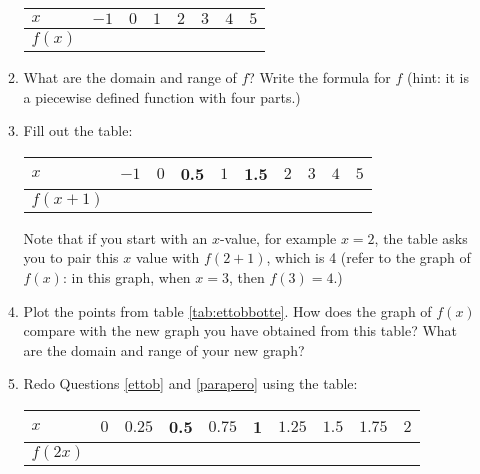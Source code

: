 \documentclass[11pt,dvipsnames]{article}
\begin{document}
\begin{enumerate}[label=$\blacktriangleright$ {\bf  \arabic*:}]
\begin{enumerate}[label=\textcolor{blue}{\bf (\alph*)}]
\begin{minipage}{\linewidth}
\centering
{} \label{tab:title} 
\begin{tabular}{|l|l|l|l|l|l|l|l|}
\hline
$x$    & $-1$ & $0$ & $1$ & $2$ & $3$ & $4$ & $5$ \\ \hline
$f(x)$ &      &     &     &     &     &     &     \\ \hline
\end{tabular}
\end{minipage}



\item What are the domain and range of $f$? Write the formula for $f$ (hint: it is a piecewise defined function with four parts.)


\item \label{ettob} Fill out the table:

\begin{minipage}{\linewidth}
\centering
{} \label{tab:ettobbotte}  
\begin{tabular}{|l|l|l|l|l|l|l|l|l|l|}
\hline
$x$    & $-1$ & $0$ & 0.5 & $1$ & 1.5 & $2$ & $3$ & $4$ & $5$ \\ \hline
$f(x+1)$ &      &     &     &     &     &     &   &  & \\ \hline
\end{tabular}
\end{minipage}

Note that if you start  with an $x$-value, for example $x=2$, the table asks you to pair this $x$ value with $f(2+1)$, which is 4 (refer to the graph of $f(x)$: in this graph, when $x=3$, then $f(3)=4$.)
\item \label{parapero} Plot the points from table \ref{tab:ettobbotte}. How does the graph of $f(x)$ compare with the new graph you have obtained from this table? What are the domain and range of your new graph?

\item Redo Questions \ref{ettob} and \ref{parapero}  using the table:

\begin{minipage}{\linewidth}
	\centering
	 \label{tab:ettob2}  
	\begin{tabular}{|l|l|l|l|l|l|l|l|l|l|}
		\hline
		$x$    & $0$ & $0.25$ & 0.5 & $0.75$ & 1 & $1.25$ & $1.5$ & $1.75$ & $2$ \\ \hline
		$f(2x)$ &      &     &     &     &     &     &   &  & \\ \hline
	\end{tabular}
\end{minipage}


\end{enumerate}
\end{enumerate}
\end{document}
